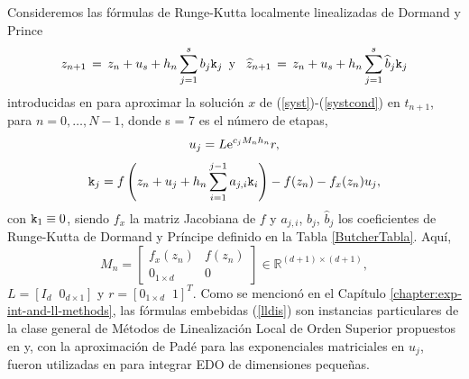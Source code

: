 Consideremos las fórmulas de Runge-Kutta localmente linealizadas de Dormand y Prince
\begin{equation} \label{lldis}
    z_{n+1}\,=\,z_n+u_s+h_n \sum_{j=1}^{s}b_j \mathtt{k}_j \,\,\, \text{y} \,\,\, \
    \widehat{z}_{n+1}\,=\, z_n+u_s+h_n \sum_{j=1}^{s}\widehat{b}_j \mathtt{k}_j
\end{equation}
introducidas en \cite{Jimenez14AMC} para aproximar la solución $x$ de (\ref{syst})-(\ref{systcond}) en $t_{n+1}$, para $n=0,\ldots,N -1$, donde s = 7 es el número de etapas,
\begin{equation*}
u_j=L\mathrm{e}^{c_j M_n h_n}r,
\end{equation*}
\begin{equation*}
\mathtt{k}_j = f\left( z_n+u_j+h_n \sum_{i=1}^{j-1}a_{j,i}\mathtt{k}_i \right) - f( z_n) - f_x(z_n)u_j,
\end{equation*}
con $\mathtt{k}_1 \equiv 0$, siendo $f_x$ la matriz Jacobiana de $f$ y $a_{j,i}$, $b_j$, $\widehat{b}_j$ los coeficientes de Runge-Kutta de Dormand y Príncipe definido en la Tabla \ref{ButcherTabla}. Aquí,
\begin{equation*}
    M_{n}=\left[
    \begin{array}{cc}
        f_{x}(z_{n}) & f(z_{n}) \\
        0_{1\times d} & 0
    \end{array}
    \right] \in \mathbb{R}^{(d+1)\times (d+1)},
\end{equation*}
$ L=[I_d \;\; 0_{d\times 1}] $ y $r=[0_{1\times d}\;\; 1]^T$. Como se mencionó en el Capítulo \ref{chapter:exp-int-and-ll-methods}, las fórmulas embebidas (\ref{lldis}) son instancias particulares de la clase general de Métodos de Linealización Local de Orden Superior propuestos en \cite{Jimenez13} y, con la aproximación de Padé para las exponenciales matriciales en $u_j$, fueron utilizadas en \cite{Jimenez14AMC} para integrar EDO de dimensiones pequeñas.

